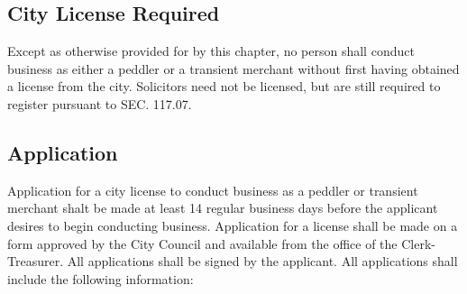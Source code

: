 \subsection{City License Required}
Except as otherwise provided for by this chapter, no person shall conduct business as either a peddler or a transient merchant without first having obtained a license from the city. Solicitors need not be licensed, but are still required to register pursuant to SEC. 117.07.
\subsection{Application}
Application for a city license to conduct business as a peddler or transient merchant shalt be made at least 14 regular business days before the applicant desires to begin conducting business. Application for a license shall be made on a form approved by the City Council and available from the office of the Clerk-Treasurer. All applications shall be signed by the applicant. All applications shall include the following information:
